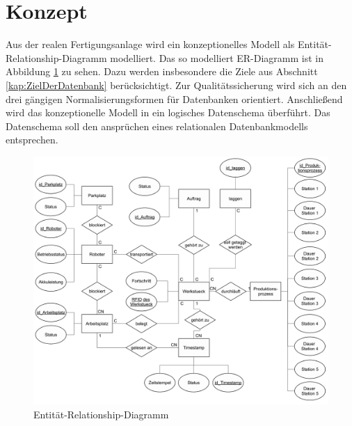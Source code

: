 \section{Konzept} \label{kap:DatenbankKonzept}
Aus der realen Fertigungsanlage wird ein konzeptionelles Modell als Entität-Relationship-Diagramm modelliert. Das so modelliert ER-Diagramm ist in Abbildung \ref{fig:ER-Diagramm} zu sehen. Dazu werden insbesondere die Ziele aus Abschnitt \ref{kap:ZielDerDatenbank} berücksichtigt. Zur Qualitätssicherung wird sich an den drei gängigen Normalisierungsformen für Datenbanken orientiert. Anschließend wird das konzeptionelle Modell in ein logisches Datenschema überführt. Das Datenschema soll den ansprüchen eines relationalen Datenbankmodells entsprechen. 
\begin{figure}[h]
	    \centering
	    \includegraphics[width=1\linewidth]{Bilder/ERChanDiagramm.png}
        \caption{Entität-Relationship-Diagramm}
        \label{fig:ER-Diagramm}
\end{figure}
 
